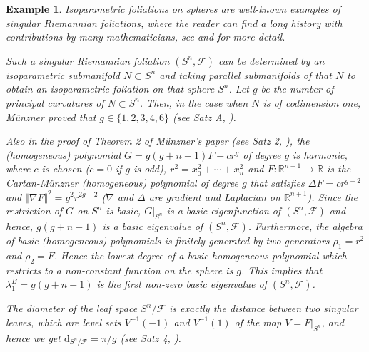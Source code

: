 \documentclass[11pt]{amsart}
\newtheorem{example}{Example}
\def\d{\mathrm{d}}
\begin{document}
\begin{example}
    Isoparametric foliations on spheres are well-known examples of singular Riemannian foliations, where the reader can find a long history with contributions by many mathematicians, see \cite{miguel} and \cite{chi} for more detail. 

    Such a singular Riemannian foliation $(S^n,\mathcal{
    F})$
    can be determined by an \textit{isoparametric submanifold} $N\subset S^n$ and taking parallel submanifolds of that $N$ to obtain an isoparametric foliation on that sphere $S^n$. Let $g$ be the number of principal curvatures of $N\subset S^n$. Then, in the case when $N$ is of codimension one, M\"unzner proved that $g\in \{1,2,3,4,6\}$ (see Satz A, \cite{munzner1}).  

Also in the proof of Theorem 2 of M\"unzner's paper (see Satz 2, \cite{munzner1}), the (homogeneous) polynomial $G=g(g+n-1)F-cr^g$ of degree $g$ is harmonic, where $c$ is chosen ($c=0$ if $g$ is odd),  $r^2=x_0^2+\cdots +x_{n}^2$ and $F:\mathbb{R}^{n+1}\to\mathbb{R}$ is the Cartan-M\"unzner (homogeneous) polynomial of degree $g$ that satisfies $\Delta F=cr^{g-2}$ and $\Vert\nabla F\Vert^2=g^2r^{2g-2}$ ($\nabla$ and $\Delta$ are gradient and Laplacian on $\mathbb{R}^{n+1}$). Since the restriction of $G$ on $S^n$ is basic, $G\vert_{S^n}$ is a basic eigenfunction of $(S^n,\mathcal{F})$ and hence, $g(g+n-1)$ is a basic eigenvalue of $(S^n,\mathcal{F})$. Furthermore, the algebra of basic (homogeneous) polynomials is finitely generated by two generators $\rho_1=r^2$ and $\rho_2=F$. Hence the lowest degree of a basic homogeneous polynomial which restricts to a non-constant function on the sphere is $g$. This implies that $\lambda_1^B=g(g+n-1)$ is the first non-zero basic eigenvalue of $(S^n,\mathcal{F})$.  

    
    The diameter of the leaf space $S^n/\mathcal{F}$ is exactly the distance between two singular leaves, which are level sets $V^{-1}(-1)$ and $V^{-1}(1)$ of the map $V=F\vert_{S^n}$, 
    and hence we get $\d_{S^n/\mathcal{F}}=\pi/g$ (see Satz 4, \cite{munzner1}). 
    

\end{example}
\end{document}
